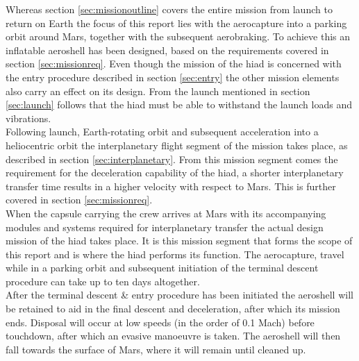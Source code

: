 Whereas section \ref{sec:missionoutline} covers the entire mission from launch to return on Earth the focus of this report lies with the aerocapture into a parking orbit around Mars, together with the subsequent aerobraking. To achieve this an inflatable aeroshell has been designed, based on the requirements covered in section \ref{sec:missionreq}. Even though the mission of the \gls{hiad} is concerned with the entry procedure described in section \ref{sec:entry} the other mission elements also carry an effect on its design. From the launch mentioned in section \ref{sec:launch} follows that the \gls{hiad} must be able to withstand the launch loads and vibrations. \\
Following launch, Earth-rotating orbit and subsequent acceleration into a heliocentric orbit the interplanetary flight segment of the mission takes place, as described in section \ref{sec:interplanetary}. From this mission segment comes the requirement for the deceleration capability of the \gls{hiad}, a shorter interplanetary transfer time results in a higher velocity with respect to Mars. This is further covered in section \ref{sec:missionreq}. \\
When the capsule carrying the crew arrives at Mars with its accompanying modules and systems required for interplanetary transfer the actual design mission of the \gls{hiad} takes place. It is this mission segment that forms the scope of this report and is where the \gls{hiad} performs its function. The aerocapture, travel while in a parking orbit and subsequent initiation of the terminal descent procedure can take up to ten days altogether. \\
After the terminal descent \& entry procedure has been initiated the aeroshell will be retained to aid in the final descent and deceleration, after which its mission ends. Disposal will occur at low speeds (in the order of 0.1 Mach) before touchdown, after which an evasive manoeuvre is taken. The aeroshell will then fall towards the surface of Mars, where it will remain until cleaned up.